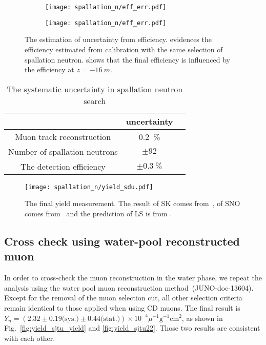 \begin{figure}[htbp]
	\centering
	\begin{subfigure}{0.5\textwidth}
		\centering
		\texttt{[image: spallation\_n/eff\_err.pdf]}
		\caption{}
		\label{fig:SPNsourceCalib}
	\end{subfigure}%
	\begin{subfigure}{0.5\textwidth}
		\centering
		\texttt{[image: spallation\_n/eff\_err.pdf]}
		\caption{}
		\label{fig:muonEffUncerntainty}
	\end{subfigure}

	\caption{The estimation of uncertainty from efficiency.  evidences the efficiency estimated from  calibration with the same selection of spallation neutron.  shows that the final efficiency is influenced by the efficiency at $z=\SI{-16}{m}$.}
	\label{fig:muonEffUncer}
\end{figure}

\begin{table}[htbp]
	\caption{The systematic uncertainty in spallation neutron search}%
	\label{tab:spn_eff_un}
	\centering%
	\begin{tabular}{ccc}
		\toprule%
		                              & uncertainty       \\
		\midrule%
		Muon track reconstruction     & \SI{0.2}{\%}      \\
		Number of spallation neutrons & $\pm92$           \\
		The detection efficiency      & $\pm\SI{0.3}{\%}$ \\
		\bottomrule
	\end{tabular}
\end{table}

\begin{figure}[htbp]
	\centering
	\texttt{[image: spallation\_n/yield\_sdu.pdf]}
	\caption{The final yield measurement. The result of SK comes from~\cite{SK_spnYn}, of SNO comes from~\cite{sno_spnYn} and the prediction of LS is from \cite{Predict_LS_Wang}.}
	\label{fig:yield_final}
\end{figure}
\subsection{Cross check using water-pool reconstructed muon}
In order to cross-check the muon reconstruction in the water phase, we repeat the analysis using the water pool muon reconstruction method~(JUNO-doc-13604). Except for the removal of the muon selection cut, all other selection criteria remain identical to those applied when using CD muons. The final result is $Y_n =( 2.32\pm0.19\text{(sys.)}\pm0.44 \text{(stat.)}) \times 10^{-4}\mu^{-1}\text{g}^{-1}\text{cm}^2$, as shown in Fig.~\ref{fig:yield_sjtu_yield} and \ref{fig:yield_sjtu22}. Those two results are consistent with each other.

